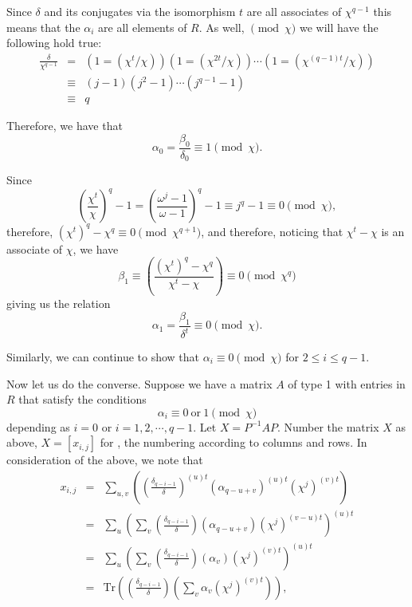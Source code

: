 \documentclass[11pt]{report}
\begin{document}
        Since $\delta$ and its conjugates via the isomorphism $t$ are all 
associates of $\chi^{q-1}$ this means
that the $\alpha_i$ are all elements of $R$. As well, $\pmod{\chi}$ we will have 
the following hold true:
\begin{align*}
\frac{\delta}{\chi^{q-1}} &=&\left(1=(\chi^t/\chi)\right) 
\left(1=(\chi^{2t}/\chi)\right)\cdots \left(1=(\chi^{(q-1)t}/\chi)\right)\\
&\equiv &(j-1)(j^2-1)\cdots(j^{q-1}-1)\\
&\equiv &q
\end{align*}

Therefore, we have that\[  \alpha_0 = \frac{\beta_0}{\delta_0}\equiv 1 \pmod{\chi}.\]

Since
\[(\frac{\chi^t}{\chi})^q-1 = \left(\frac{\omega^j-1}{\omega-1}\right)^q-1 \equiv
j^q - 1 \equiv 0 \pmod{\chi},\]
therefore, $(\chi^t)^q-\chi^q\equiv 0 \pmod{\chi^{q+1}}$, and therefore, 
noticing that 
$\chi^t-\chi$ is an associate of $\chi$, we have
\[\beta_1\equiv\left(\frac{(\chi^t)^q-\chi^q}{\chi^t-\chi}\right)
\equiv 0 \pmod{\chi^q}\]
giving us the relation
\[        \alpha_1 =\frac{\beta_1}{\delta^t}\equiv 0\pmod{\chi}.\]

Similarly, we can continue to show that $\alpha_i\equiv0 \pmod{\chi}$ for 
$2\le i \le q-1$.


        Now let us do the converse. Suppose we have a matrix $A$ of type 1 
with entries in $R$
that satisfy the conditions
\[\alpha_i\equiv 0\mathrm{\ or\ }1 \pmod{\chi}\]
depending as $i=0$ or $i=1,2,\cdots,q-1$. Let $X = P^{-1} A P$. Number the 
matrix $X$ as above, $X=[x_{i,j}]$ for ,
the numbering according to columns and rows. In 
consideration of the above, we
note that
\begin{align*}
x_{i,j}&=&\sum_{u,v}\left((\frac{\delta_{q-i-1}}{\delta})^{(u)t}
(\alpha_{q-u+v})^{(u)t}(\chi^j)^{(v)t}\right)\\
&=&\sum_u\left(\sum_v(\frac{\delta_{q-i-1}}{\delta})
(\alpha_{q-u+v})(\chi^j)^{(v-u)t}\right)^{(u)t} \\
&=&\sum_u\left(\sum_v(\frac{\delta_{q-i-1}}{\delta})
(\alpha_{v})(\chi^j)^{(v)t}\right)^{(u)t} \\
&=&\mathrm{Tr}\left((\frac{\delta_{q-i-1}}{\delta})
(\sum_v\alpha_{v}(\chi^j)^{(v)t})\right),
\end{align*}
\end{document}
